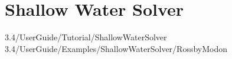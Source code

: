 \section{Shallow Water Solver}

3.4/UserGuide/Tutorial/ShallowWaterSolver
3.4/UserGuide/Examples/ShallowWaterSolver/RossbyModon
